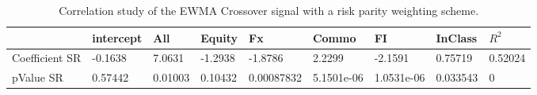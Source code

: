 \begin{table}[H]
\centering
\begin{tabular}{lllllllll}
\hline& intercept & All & Equity & Fx & Commo & FI & InClass & $R^{2}$ \\ 
\hline 
Coefficient SR & -0.1638 & 7.0631 & -1.2938 & -1.8786 & 2.2299 & -2.1591 & 0.75719 & 0.52024 \\ 
pValue SR & 0.57442 & 0.01003 & 0.10432 & 0.00087832 & 5.1501e-06 & 1.0531e-06 & 0.033543 & 0 \\ 
\hline
\end{tabular}
\caption{Correlation study of the EWMA Crossover signal with a risk parity weighting scheme.}
\label{MBBSRPOQ_CORR}
\end{table}